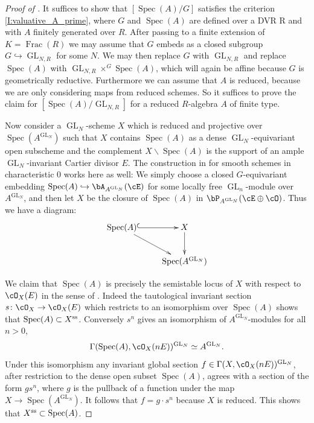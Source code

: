 \documentclass[a4paper]{amsart}
\numberwithin{equation}{section}
\theoremstyle{plain}
\theoremstyle{definition}
\DeclareMathOperator{\Spec}{Spec}
\DeclareMathOperator{\GL}{GL}
\DeclareMathOperator{\Frac}{Frac}
\newcommand{\co}{\colon}
\renewcommand{\ss}{{\rm ss}}
\begin{document}
\begin{proof}[Proof of ]
It suffices to show that $[\Spec(A) / G]$ satisfies the criterion \ref{I:valuative_A_prime}, where $G$ and $\Spec(A)$ are defined over a DVR R and with $A$ finitely generated over $R$. After passing to a finite extension of $K = \Frac(R)$ we may assume that $G$ embeds as a closed subgroup $G \hookrightarrow \GL_{N,R}$ for some $N$. We may then replace $G$ with $\GL_{N,R}$ and replace $\Spec(A)$ with $\GL_{N,R} \times^G \Spec(A)$, which will again be affine because $G$ is geometrically reductive. Furthermore we can assume that $A$ is reduced, because we are only considering maps from reduced schemes. So it suffices to prove the claim for $[\Spec(A)/\GL_{N,R}]$ for a reduced $R$-algebra $A$ of finite type.

Now consider a $\GL_N$-scheme $X$ which is reduced and projective over $\Spec(A^{\GL_N})$ such that $X$ contains $\Spec(A)$ as a dense $\GL_N$-equivariant open subscheme and the complement $X \smallsetminus \Spec(A)$ is the support of an ample $\GL_N$-invariant Cartier divisor $E$. The construction in \cite[Lem.~6.1]{Teleman} for smooth schemes in characteristic $0$ works here as well: We simply choose a closed $G$-equivariant embedding $\Spec(A) \hookrightarrow \bA_{A^{\GL_N}}(\cE)$ for some locally free $\GL_n$-module over $A^{\GL_N}$, and then let $X$ be the closure of $\Spec(A)$ in $\bP_{A^{\GL_N}}(\cE \oplus \cO)$. Thus we have a diagram:
\[
\xymatrix{\Spec(A) \ar@{^{(}->}[r] \ar[dr] & X \ar[d] \\ & \Spec(A^{\GL_N})}
\]

We claim that $\Spec(A)$ is precisely the semistable locus of $X$ with respect to $\cO_X(E)$ in the sense of \cite{Seshadri}. Indeed the tautological invariant section $s \co \cO_X \to \cO_X(E)$ which restricts to an isomorphism over $\Spec(A)$ shows that $\Spec(A) \subset X^{\ss}$. Conversely $s^n$ gives an isomorphism of $A^{\GL_N}$-modules for all $n>0$,$$\Gamma(\Spec(A),\cO_X(nE))^{\GL_N} \simeq A^{\GL_N}.$$Under this isomorphism any invariant global section $f \in \Gamma(X,\cO_X(nE))^{\GL_N}$, after restriction to the dense open subset $\Spec(A)$, agrees with a section of the form $g s^n$, where $g$ is the pullback of a function under the map $X \to \Spec(A^{\GL_N})$. It follows that $f = g \cdot s^n$ because $X$ is reduced. This shows that $X^{\ss} \subset \Spec(A)$.


\end{proof}
\end{document}
